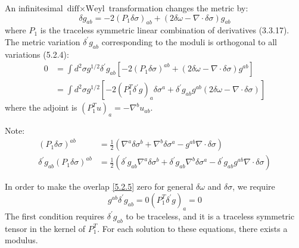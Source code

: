 An infinitesimal $\text{diff} \times \text{Weyl}$ transformation changes the metric by:
\begin{equation}
	\delta g_{a b}=-2\left(P_{1} \delta \sigma\right)_{a b}+(2 \delta \omega-\nabla \cdot \delta \sigma) g_{a b}\label{5.2.4}
\end{equation}
where $P_{1}$ is the traceless symmetric linear combination of derivatives (3.3.17). The metric variation $\delta^{\prime} g_{a b}$ corresponding to the moduli is orthogonal to all variations (5.2.4):
\begin{equation}
	\begin{aligned}
		0 &=\int d^{2} \sigma g^{1 / 2} \delta^{\prime} g_{a b}\left[-2\left(P_{1} \delta \sigma\right)^{a b}+(2 \delta \omega-\nabla \cdot \delta \sigma) g^{a b}\right] \\
		&=\int d^{2} \sigma g^{1 / 2}\left[-2\left(P_{1}^{T} \delta^{\prime} g\right)_{a} \delta \sigma^{a}+\delta^{\prime} g_{a b} g^{a b}(2 \delta \omega-\nabla \cdot \delta \sigma)\right]
	\end{aligned}\label{5.2.5}
\end{equation}
where the adjoint is $\left(P_{1}^{T} u\right)_{a}=-\nabla^{b} u_{a b}$.

\begin{tcolorbox}[breakable]
	Note:
	\begin{align*}
		(P_1\delta \sigma)^{a b}&=\frac{1}{2}\left(\nabla^{a} \delta \sigma^{b}+\nabla^{b} \delta \sigma^{a}-g^{a b} \nabla \cdot \delta \sigma\right) \\
		\delta^{\prime} g_{a b}(P_1 \delta \sigma)^{a b}&=\frac{1}{2}\left(\delta^{\prime} g_{a b} \nabla^{a} \delta \sigma^{b}+\delta^{\prime} g_{a b} \nabla^{b} \delta \sigma^{a}-\delta^{\prime} g_{a b} g^{a b} \nabla \cdot \delta \sigma\right)
	\end{align*}
\end{tcolorbox}

In order to make the overlap \eqref{5.2.5} zero for general $\delta \omega$ and $\delta \sigma$, we require
\begin{subequations}
	\begin{equation}
		g^{a b} \delta^{\prime} g_{a b} =0 
	\end{equation}	
	\begin{equation}
		\left(P_{1}^{T} \delta^{\prime} g\right)_{a} =0
	\end{equation}			\label{5.2.6}
\end{subequations}
The first condition requires $\delta^{\prime} g_{a b}$ to be traceless, and it is a traceless symmetric tensor in the kernel of $P_{1}^{T}$. For each solution to these equations, there exists a modulus.

